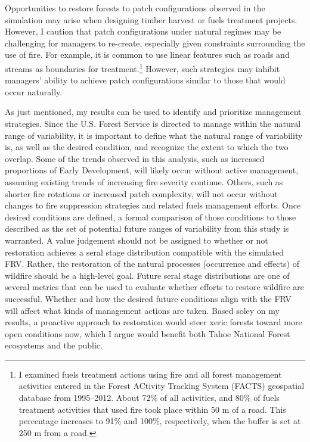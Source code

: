 Opportunities to restore forests to patch configurations observed in the simulation may arise when designing timber harvest or fuels treatment projects. However, I caution that patch configurations under natural regimes may be challenging for managers to re-create, especially given constraints surrounding the use of fire. For example, it is common to use linear features such as roads and streams as boundaries for treatment.\footnote{I examined fuels treatment actions using fire and all forest management activities entered in the Forest ACtivity Tracking System (FACTS) geospatial database from 1995--2012. About 72\% of all activities, and 80\% of fuels treatment activities that used fire took place within 50 m of a road. This percentage increases to 91\% and 100\%, respectively, when the buffer is set at 250 m from a road.} However, such strategies may inhibit managers' ability to achieve patch configurations similar to those that would occur naturally.

As just mentioned, my results can be used to identify and prioritize management strategies. Since the U.S. Forest Service is directed to manage within the natural range of variability, it is important to define what the natural range of variability is, as well as the desired condition, and recognize the extent to which the two overlap. Some of the trends observed in this analysis, such as increased proportions of Early Development, will likely occur without active management, assuming existing trends of increasing fire severity continue. Others, such as shorter fire rotations or increased patch complexity, will not occur without changes to fire suppression strategies and related fuels management efforts. Once desired conditions are defined, a formal comparison of those conditions to those described as the set of potential future ranges of variability from this study is warranted. A value judgement should not be assigned to whether or not restoration achieves a seral stage distribution compatible with the simulated FRV. Rather, the restoration of the natural processes (occurrence and effects) of wildfire should be a high-level goal. Future seral stage distributions are one of several metrics that can be used to evaluate whether efforts to restore wildfire are successful. Whether and how the desired future conditions align with the FRV will affect what kinds of management actions are taken. Based soley on my results, a proactive approach to restoration would steer xeric forests toward more open conditions now, which I argue would benefit both Tahoe National Forest ecosystems and the public.

